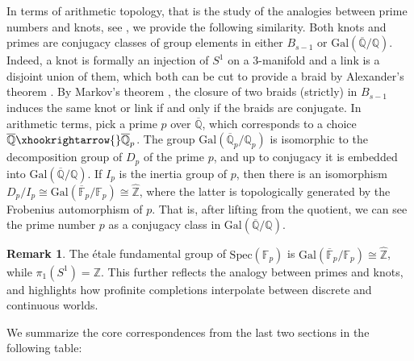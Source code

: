 \documentclass[10pt]{amsart}
\theoremstyle{definition}
\newtheorem{remark}[theorem]{Remark}
\newcommand{\Z}{\mathbb{Z}}
\newcommand{\Q}{\mathbb{Q}}
\newcommand{\Gal}{{ \mathrm{Gal}}}
\begin{document}
In terms of arithmetic topology, that is the study of the analogies between prime numbers and knots, see \cite{Morishita2011-yw}, we provide the following similarity. 
Both knots and primes are conjugacy classes of group elements in either $B_{s-1}$ or $\Gal(\overline{\Q}/\Q)$. 
Indeed, a knot is formally an injection of $S^1$ on a $3$-manifold and a link is a disjoint union of them, which both can be cut to provide a braid by Alexander's theorem \cite[Thm. 2.3]{MR2435235}. 
By Markov's theorem \cite[Thm. 2.8]{MR2435235}, the closure of two braids (strictly) in $B_{s-1}$ induces the same knot or link if and only if the braids are conjugate. In arithmetic terms, pick a prime $p$ over $\overline{\Q}$, which corresponds to a choice $\overline{\Q} \xhookrightarrow{} \overline{\Q}_p$. 
The group $\Gal( \overline{\Q}_p/\Q_p)$ is isomorphic to the decomposition group of $D_p$ of the prime $p$, and up to conjugacy it is embedded into $\Gal(\overline{\Q}/\Q)$. If $I_p$ is the inertia group of $p$, then there is an isomorphism $D_p/I_p \cong \Gal(\overline{\mathbb{F}}_p/\mathbb{F}_p)\cong \hat{\Z}$, where the latter is topologically generated by the Frobenius automorphism of $p$. 
That is, after lifting from the quotient, we can see the prime number $p$ as a conjugacy class in $\Gal(\overline{\Q}/\Q)$. 
\begin{remark}
    The étale fundamental group of $\mathrm{Spec}(\mathbb{F}_p)$ is $\Gal(\overline{\mathbb{F}}_p/\mathbb{F}_p)\cong \hat{\Z}$, while $\pi_1(S^1) = \Z$. This further reflects the analogy between primes and knots, and highlights how profinite completions interpolate between discrete and continuous worlds.
\end{remark}

We summarize the core correspondences from the last two sections in the following table:
\end{document}
